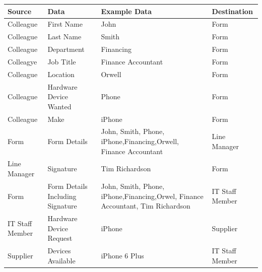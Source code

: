 \begin{center}
\begin{tabular}{|p{3cm}|p{3cm}|p{4cm}|p{3cm}|}
\hline
\textbf{Source} & \textbf{Data} & \textbf{Example Data}      & \textbf{Destination} \\ \hline
Colleague                             & First Name                         & John                                               & Form                                      \\ \hline
Colleague                             & Last Name                          & Smith                                              & Form                                      \\ \hline
Colleague                             & Department                              & Financing                                            & Form                                      \\ \hline
Colleagye 			& Job Title				& Finance Accountant				& Form			\\ \hline
Colleague                             & Location                              & Orwell                                            & Form                                      \\ \hline
Colleague                             & Hardware Device Wanted             & Phone                                              & Form                                      \\ \hline
Colleague                             & Make                               & iPhone                                             & Form                                      \\ \hline
Form                                  & Form Details                       & John, Smith, Phone, iPhone,Financing,Orwell, Finance Accountant                & Line Manager                              \\ \hline
Line Manager                          & Signature                          & Tim Richardson                                     & Form                                      \\ \hline
Form                                  & Form Details Including Signature   & John, Smith, Phone, iPhone,Financing,Orwel,  Finance Accountant, Tim Richardson & IT Staff Member                           \\ \hline
IT Staff Member 	&Hardware Device Request & iPhone & Supplier 												\\ \hline
Supplier & Devices Available & iPhone 6 Plus & IT Staff Member \\ \hline

\end{tabular}
\end{center}
